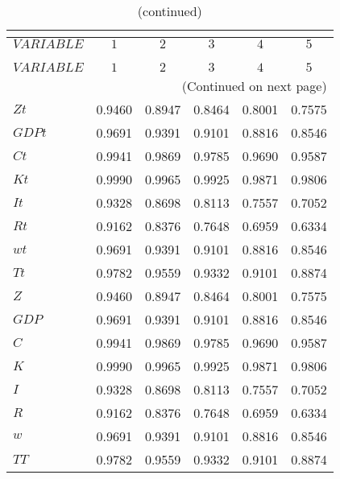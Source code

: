  
\begin{center}
\begin{longtable}{lccccc} 
\caption{AUTOCORRELATION OF SIMULATED VARIABLES}\\
 \label{Table:sim_autocorr_matrix}\\
\toprule 
$VARIABLE  $	 & 	 $         1$	 & 	 $         2$	 & 	 $         3$	 & 	 $         4$	 & 	 $         5$\\
\midrule \endfirsthead 
\caption{(continued)}\\
 \toprule \\ 
$VARIABLE  $	 & 	 $         1$	 & 	 $         2$	 & 	 $         3$	 & 	 $         4$	 & 	 $         5$\\
\midrule \endhead 
\midrule \multicolumn{6}{r}{(Continued on next page)} \\ \bottomrule \endfoot 
\bottomrule \endlastfoot 
$Zt        $	 & 	    0.9460	 & 	    0.8947	 & 	    0.8464	 & 	    0.8001	 & 	    0.7575 \\ 
$GDPt      $	 & 	    0.9691	 & 	    0.9391	 & 	    0.9101	 & 	    0.8816	 & 	    0.8546 \\ 
$Ct        $	 & 	    0.9941	 & 	    0.9869	 & 	    0.9785	 & 	    0.9690	 & 	    0.9587 \\ 
$Kt        $	 & 	    0.9990	 & 	    0.9965	 & 	    0.9925	 & 	    0.9871	 & 	    0.9806 \\ 
$It        $	 & 	    0.9328	 & 	    0.8698	 & 	    0.8113	 & 	    0.7557	 & 	    0.7052 \\ 
$Rt        $	 & 	    0.9162	 & 	    0.8376	 & 	    0.7648	 & 	    0.6959	 & 	    0.6334 \\ 
$wt        $	 & 	    0.9691	 & 	    0.9391	 & 	    0.9101	 & 	    0.8816	 & 	    0.8546 \\ 
$Tt        $	 & 	    0.9782	 & 	    0.9559	 & 	    0.9332	 & 	    0.9101	 & 	    0.8874 \\ 
$Z         $	 & 	    0.9460	 & 	    0.8947	 & 	    0.8464	 & 	    0.8001	 & 	    0.7575 \\ 
$GDP       $	 & 	    0.9691	 & 	    0.9391	 & 	    0.9101	 & 	    0.8816	 & 	    0.8546 \\ 
$C         $	 & 	    0.9941	 & 	    0.9869	 & 	    0.9785	 & 	    0.9690	 & 	    0.9587 \\ 
$K         $	 & 	    0.9990	 & 	    0.9965	 & 	    0.9925	 & 	    0.9871	 & 	    0.9806 \\ 
$I         $	 & 	    0.9328	 & 	    0.8698	 & 	    0.8113	 & 	    0.7557	 & 	    0.7052 \\ 
$R         $	 & 	    0.9162	 & 	    0.8376	 & 	    0.7648	 & 	    0.6959	 & 	    0.6334 \\ 
$w         $	 & 	    0.9691	 & 	    0.9391	 & 	    0.9101	 & 	    0.8816	 & 	    0.8546 \\ 
$TT        $	 & 	    0.9782	 & 	    0.9559	 & 	    0.9332	 & 	    0.9101	 & 	    0.8874 \\ 
\end{longtable}
 \end{center}
